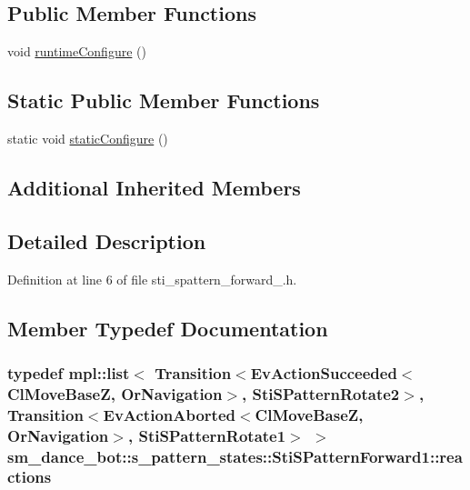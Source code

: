 \subsection*{Public Member Functions}
\begin{DoxyCompactItemize}
\item 
void \hyperlink{structsm__dance__bot_1_1s__pattern__states_1_1StiSPatternForward1_a3ca41a49f5b4cedcd780c9a0ce00d8b2}{runtime\+Configure} ()
\end{DoxyCompactItemize}
\subsection*{Static Public Member Functions}
\begin{DoxyCompactItemize}
\item 
static void \hyperlink{structsm__dance__bot_1_1s__pattern__states_1_1StiSPatternForward1_ae48ef3918bc8febd6cc4009573862e1c}{static\+Configure} ()
\end{DoxyCompactItemize}
\subsection*{Additional Inherited Members}


\subsection{Detailed Description}


Definition at line 6 of file sti\+\_\+spattern\+\_\+forward\+\_.\+h.



\subsection{Member Typedef Documentation}
\subsubsection[{\texorpdfstring{reactions}{reactions}}]{\setlength{\rightskip}{0pt plus 5cm}typedef mpl\+::list$<$ Transition$<${\bf Ev\+Action\+Succeeded}$<${\bf Cl\+Move\+BaseZ}, {\bf Or\+Navigation}$>$, {\bf Sti\+S\+Pattern\+Rotate2}$>$, Transition$<${\bf Ev\+Action\+Aborted}$<${\bf Cl\+Move\+BaseZ}, {\bf Or\+Navigation}$>$, {\bf Sti\+S\+Pattern\+Rotate1}$>$ $>$ {\bf sm\+\_\+dance\+\_\+bot\+::s\+\_\+pattern\+\_\+states\+::\+Sti\+S\+Pattern\+Forward1\+::reactions}}\hypertarget{structsm__dance__bot_1_1s__pattern__states_1_1StiSPatternForward1_a0f2c2bef4b7c495986680947b3f76b6f}{}\label{structsm__dance__bot_1_1s__pattern__states_1_1StiSPatternForward1_a0f2c2bef4b7c495986680947b3f76b6f}


